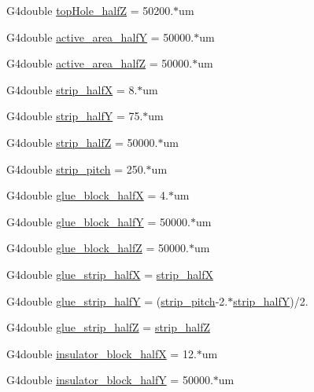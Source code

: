 \begin{DoxyCompactItemize}
\item 
G4double \hyperlink{structUMConfig_ab90829b627e0674333d365671c58cbb3}{top\+Hole\+\_\+half\+Z} = 50200.$\ast$um
\item 
G4double \hyperlink{structUMConfig_a5f1596eab9aa3565950c73754dda39cb}{active\+\_\+area\+\_\+half\+Y} = 50000.$\ast$um
\item 
G4double \hyperlink{structUMConfig_aa2d3a8ec4fbc8426464a7894a162be39}{active\+\_\+area\+\_\+half\+Z} = 50000.$\ast$um
\item 
G4double \hyperlink{structUMConfig_a0a439e9bae5313eae0b610d4fc48a92e}{strip\+\_\+half\+X} = 8.$\ast$um
\item 
G4double \hyperlink{structUMConfig_aff9af991da94cb258f8c2c4152312c87}{strip\+\_\+half\+Y} = 75.$\ast$um
\item 
G4double \hyperlink{structUMConfig_afcaa55dfeaaf636b1e07efb7231fe079}{strip\+\_\+half\+Z} = 50000.$\ast$um
\item 
G4double \hyperlink{structUMConfig_ab675c737dc9cdc956961ce0b5af3e2f3}{strip\+\_\+pitch} = 250.$\ast$um
\item 
G4double \hyperlink{structUMConfig_ac5c60ff26c74f3d07cfabe0b028ffa1c}{glue\+\_\+block\+\_\+half\+X} = 4.$\ast$um
\item 
G4double \hyperlink{structUMConfig_a8156f7cb9cf8e37d84e14eb76822c74f}{glue\+\_\+block\+\_\+half\+Y} = 50000.$\ast$um
\item 
G4double \hyperlink{structUMConfig_a136d2f46047e3459563a35438d86fe1f}{glue\+\_\+block\+\_\+half\+Z} = 50000.$\ast$um
\item 
G4double \hyperlink{structUMConfig_ac5c105b2556a33fa698e7e8b82f9b762}{glue\+\_\+strip\+\_\+half\+X} = \hyperlink{structUMConfig_a0a439e9bae5313eae0b610d4fc48a92e}{strip\+\_\+half\+X}
\item 
G4double \hyperlink{structUMConfig_ad5188e37a8f89f27ba1c90e3ad00ed83}{glue\+\_\+strip\+\_\+half\+Y} = (\hyperlink{structUMConfig_ab675c737dc9cdc956961ce0b5af3e2f3}{strip\+\_\+pitch}-\/2.$\ast$\hyperlink{structUMConfig_aff9af991da94cb258f8c2c4152312c87}{strip\+\_\+half\+Y})/2.
\item 
G4double \hyperlink{structUMConfig_aa70a06439791fd9f4bb81ce2fc342f92}{glue\+\_\+strip\+\_\+half\+Z} = \hyperlink{structUMConfig_afcaa55dfeaaf636b1e07efb7231fe079}{strip\+\_\+half\+Z}
\item 
G4double \hyperlink{structUMConfig_aa5646f5b664fb67e9315c46d54690424}{insulator\+\_\+block\+\_\+half\+X} = 12.$\ast$um
\item 
G4double \hyperlink{structUMConfig_a41c70da919e44de22920f7b1704790ca}{insulator\+\_\+block\+\_\+half\+Y} = 50000.$\ast$um

\end{DoxyCompactItemize}
